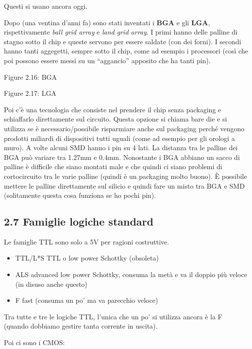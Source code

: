 \documentclass[
]{article}
\providecommand{\tightlist}{%
  \setlength{\itemsep}{0pt}\setlength{\parskip}{0pt}}
\begin{document}
Questi si usano ancora oggi.

Dopo (una ventina d'anni fa) sono stati inventati i \textbf{BGA} e gli
\textbf{LGA}, rispettivamente \emph{ball grid array} e \emph{land grid
array}. I primi hanno delle palline di stagno sotto il chip e queste
servono per essere saldate (con dei forni). I secondi hanno tanti
aggegetti, sempre sotto il chip, come ad esempio i processori (così che
poi possono essere messi su un ``aggancio'' apposito che ha tanti pin).

Figure 2.16: BGA

Figure 2.17: LGA

Poi c'è una tecnologia che consiste nel prendere il chip senza packaging
e schiaffarlo direttamente sul circuito. Questa opzione si chiama bare
die e si utilizza se è necessario/possibile risparmiare anche sul
packaging perché vengono prodotti miliardi di dispositivi tutti uguali
(come ad esempio per gli orologi a muro). \newline A volte alcuni SMD
hanno i pin su 4 lati. \newline  La distanza tra le palline dei BGA può
variare tra 1.27mm e 0.4mm. Nonostante i BGA abbiano un sacco di palline
è difficile che siano montati male e che quindi ci siano problemi di
cortocircuito tra le varie palline (quindi è un packaging molto buono).
È possibile mettere le palline direttamente sul silicio e quindi fare un
misto tra BGA e SMD (solitamente questa cosa funziona se ho pochi pin).

\subsection{2.7 Famiglie logiche
standard}\label{famiglie-logiche-standard}

Le famiglie TTL sono solo a 5V per ragioni costruttive.

\begin{itemize}
\tightlist
\item
  TTL/L*S TTL o low power Schottky (obsoleta)
\item
  ALS advanced low power Schottky, consuma la metà e va il doppio più
  veloce (in disuso anche questo)
\item
  F fast (consuma un po' ma va parecchio veloce)
\end{itemize}

Tra tutte e tre le logiche TTL, l'unica che un po' si utilizza ancora è
la F (quando dobbiamo gestire tanta corrente in uscita).

Poi ci sono i CMOS:
\end{document}
